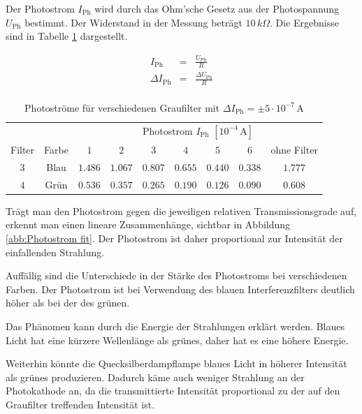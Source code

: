 \documentclass[12pt,a4paper]{scrartcl}
\numberwithin{equation}{section} %
\begin{document}
Der Photostrom $I_\mathrm{Ph}$ wird durch das Ohm'sche Gesetz aus der Photospannung $U_\mathrm{Ph}$ bestimmt. Der Widerstand in der Messung beträgt $10 \,k\Omega$. Die Ergebnisse sind in Tabelle \ref{tab:Photostrom Ergebnisse} dargestellt.

\begin{eqnarray}
	I_\mathrm{Ph} &=& \frac{U_\mathrm{Ph}}{R} \\
	\Delta I_\mathrm{Ph} &=& \frac{\Delta U_\mathrm{Ph}}{R}\\
\end{eqnarray}

\begin{table}[h!]
	\centering
	\begin{tabular}{c|c|c|c|c|c|c|c|c}
		&& \multicolumn{7}{c}{Photostrom $I_\mathrm{Ph}$ $[10^{-4}\mathrm{\,A}]$} \\
		Filter & Farbe & $1$ & $2$ & $3$ & $4$ & $5$ & $6$ & ohne Filter\\
		\hline
		$3$ & Blau & $1.486$ & $1.067$ & $0.807$ & $0.655$ & $0.440$ & $0.338$ & $1.777$ \\
		$4$ & Grün & $0.536$ & $0.357$ & $0.265$ & $0.190$ & $0.126$ & $0.090$ & $0.608$
	\end{tabular}
	\caption{Photoströme für verschiedenen Graufilter mit $\Delta I_\mathrm{Ph} = \pm 5 \cdot 10^{-7} \mathrm{\,A}$}
	\label{tab:Photostrom Ergebnisse}
\end{table}

\noindent
Trägt man den Photostrom gegen die jeweiligen relativen Transmissionsgrade auf, erkennt man einen lineare Zusammenhänge, sichtbar in Abbildung \ref{abb:Photostrom fit}. Der Photostrom ist daher proportional zur Intensität der einfallenden Strahlung.

Auffällig sind die Unterschiede in der Stärke des Photostroms bei verschiedenen Farben. Der Photostrom ist bei Verwendung des blauen Interferenzfilters deutlich höher als bei der des grünen.

Das Phänomen kann durch die Energie der Strahlungen erklärt werden. Blaues Licht hat eine kürzere Wellenlänge als grünes, daher hat es eine höhere Energie.

Weiterhin könnte die Quecksilberdampflampe blaues Licht in höherer Intensität als grünes produzieren. Dadurch käme auch weniger Strahlung an der Photokathode an, da die transmittierte Intensität proportional zu der auf den Graufilter treffenden Intensität ist.
\end{document}

